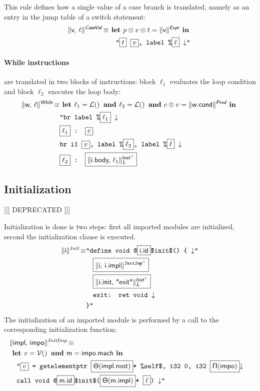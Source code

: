 \documentclass{llncs}
\newcommand{\trad}[2]{\ensuremath{\lVert \textsf{#1} \rVert^{\textit{#2}}}}
\newcommand{\nl}[0]{\ensuremath{\downarrow}}
\DeclareMathOperator{\isdef}{\equiv}
\DeclareMathOperator{\lbl}{\mathcal{L}()}
\DeclareMathOperator{\variable}{\mathcal{V}()}
\newcommand{\llvm}[1]{\texttt{#1}}
\newcommand{\B}[1]{\textsf{#1}}
\newcommand{\ListOf}[1]{$\mbox{#1}^+$}
\newcommand{\LET}[0]{\textbf{ let }}
\newcommand{\IN}[0]{\textbf{ in }}
\newcommand{\AND}[0]{\textbf{ and }}
\newcommand{\PH}[1]{\framebox{$#1$}}
\newcommand{\sep}[0]{\otimes}
\newcommand{\idx}[0]{\ensuremath{\sf\Pi}}
\newcommand{\state}[0]{\ensuremath{\sf\Theta}}
\begin{document}
\begin{enumerate}
This rule defines how a single value of a case branch is translated, namely
as an entry in the jump table of a switch statement:
\begin{align*}
  \trad{v, $\ell$}{\B{CaseVal}} \isdef & \LET p \sep v \sep t = \trad{v}{\B{Expr}} \IN \\
  & \quad \llvm{"\PH{t} \PH{v}, label \%\PH{\ell} \nl"}
\end{align*}

\paragraph{While instructions} are translated in two blocks of instructions:
block $\ell_1$ evaluates the loop condition and block $\ell_2$ executes the loop
body:
\begin{align*}
\begin{split}
\trad{w, $\ell$}{\B{While}} \isdef 
  & \LET \ell_1 = \lbl \AND \ell_2 = \lbl \AND c \sep v = \trad{w.cond}{\B{Pred}} \IN \\
  & \llvm{"br label \%\PH{\ell_1} \nl} \\
  & \llvm{\PH{\ell_1} : \PH{c}} \\
  & \llvm{br i1 \PH{v}, label \%\PH{\ell_2}, label \%\PH{\ell} \nl} \\
  & \llvm{\PH{\ell_2} : \PH{\trad{i.body, $\ell_1$}{\ListOf{\B{Inst}}}_L}}
\end{split}
\end{align*}

\subsection{Initialization}
\label{sec:trad-init}

[[[ DEPRECATED ]]]

Initialization is done is two steps: first all imported modules are
initialized,  second the initialization clause is executed.
\begin{align*}
  \trad{i}{Init} \isdef
  & \llvm{"define void @\PH{\B{i.id}}\$init\$() \{ \nl"} \\
  & \quad\llvm{\PH{\trad{i, i.impl}{\ListOf{InitImp}}}} \\
  & \quad\llvm{\PH{\trad{i.init, "exit"}{\ListOf{\B{Inst}}}_L}} \\
  & \quad\llvm{exit: ret void \nl} \\
  & \llvm{\}"}
\end{align*}
The initialization of an imported module is performed by a call to the
corresponding initialization function:
\begin{align*}
  \lefteqn{\trad{\B{impl}, \B{impo}}{InitImp} \isdef} \\
  & \LET v = \variable \AND \B{m} = \B{impo.mach} \IN \\
  & \quad \llvm{"\PH{v} = getelementptr \PH{\state(\B{impl.root})}* \%self\$, i32 0, i32 \PH{\idx(\B{impo})}\nl}\\
  & \quad \llvm{call void @\PH{\B{m.id}}\$init\$(\PH{\state(\B{m.impl})}*
    \PH{\ell}) \nl"}
\end{align*}


\end{enumerate}
\end{document}
